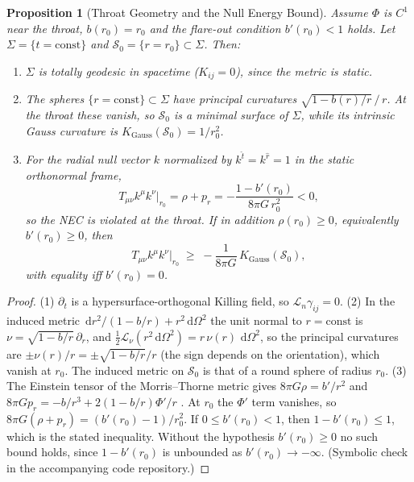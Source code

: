 \documentclass[11pt,reqno]{amsart}
\newtheorem{proposition}[theorem]{Proposition}
\theoremstyle{definition}
\providecommand{\dif}{\,\mathrm{d}}
\numberwithin{equation}{section}
\begin{document}
\begin{proposition}[Throat Geometry and the Null Energy Bound]
\label{prop:wormhole_throat}
Assume $\Phi$ is $C^1$ near the throat, $b(r_0) = r_0$ and the flare-out condition $b'(r_0) < 1$ holds. Let $\Sigma = \{t = \text{const}\}$ and $\mathcal{S}_0 = \{r = r_0\} \subset \Sigma$. Then:
\begin{enumerate}
    \item $\Sigma$ is totally geodesic in spacetime ($K_{ij} = 0$), since the metric is static.
    \item The spheres $\{r = \text{const}\} \subset \Sigma$ have principal curvatures $\sqrt{1 - b(r)/r}\,/\,r$. At the throat these vanish, so $\mathcal{S}_0$ is a minimal surface of $\Sigma$, while its intrinsic Gauss curvature is $K_{\mathrm{Gauss}}(\mathcal{S}_0) = 1/r_0^2$.
    \item For the radial null vector $k$ normalized by $k^{\hat t} = k^{\hat r} = 1$ in the static orthonormal frame,
    \begin{equation}
        T_{\mu\nu}k^\mu k^\nu\big|_{r_0} = \rho + p_r = -\frac{1 - b'(r_0)}{8\pi G\, r_0^2} < 0,
    \end{equation}
    so the NEC is violated at the throat. If in addition $\rho(r_0) \ge 0$, equivalently $b'(r_0) \ge 0$, then
    \begin{equation}
        T_{\mu\nu}k^\mu k^\nu\big|_{r_0} \;\ge\; -\frac{1}{8\pi G}\, K_{\mathrm{Gauss}}(\mathcal{S}_0),
    \end{equation}
    with equality iff $b'(r_0) = 0$.
\end{enumerate}
\end{proposition}
\begin{proof}
(1) $\partial_t$ is a hypersurface-orthogonal Killing field, so $\mathcal{L}_n \gamma_{ij} = 0$. (2) In the induced metric $\dif r^2/(1 - b/r) + r^2\dif\Omega^2$ the unit normal to $r = \text{const}$ is $\nu = \sqrt{1 - b/r}\,\partial_r$, and $\tfrac{1}{2}\mathcal{L}_\nu(r^2\dif\Omega^2) = r\,\nu(r)\,\dif\Omega^2$, so the principal curvatures are $\pm\nu(r)/r = \pm\sqrt{1 - b/r}/r$ (the sign depends on the orientation), which vanish at $r_0$. The induced metric on $\mathcal{S}_0$ is that of a round sphere of radius $r_0$. (3) The Einstein tensor of the Morris--Thorne metric gives $8\pi G\rho = b'/r^2$ and $8\pi G p_r = -b/r^3 + 2(1 - b/r)\Phi'/r$ \cite{morristhorne1988}. At $r_0$ the $\Phi'$ term vanishes, so $8\pi G(\rho + p_r) = (b'(r_0) - 1)/r_0^2$. If $0 \le b'(r_0) < 1$, then $1 - b'(r_0) \le 1$, which is the stated inequality. Without the hypothesis $b'(r_0) \ge 0$ no such bound holds, since $1 - b'(r_0)$ is unbounded as $b'(r_0) \to -\infty$. (Symbolic check in the accompanying code repository.)
\end{proof}
\end{document}
